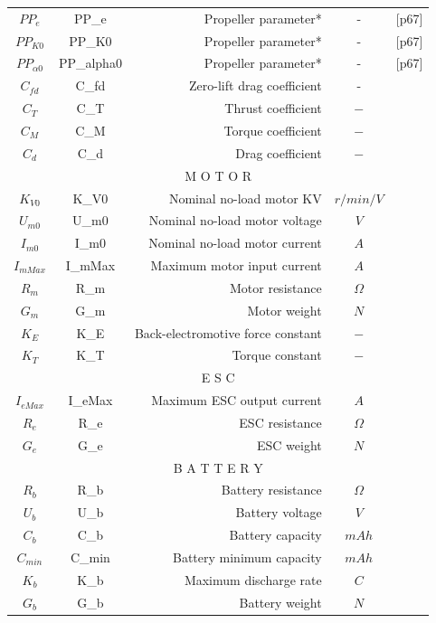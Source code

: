 \documentclass{article} %
\numberwithin{equation}{section} %
\begin{document}
{\begin{tabular}{c|c|r|c|l}
$PP_e$           	   	& PP\_e			& Propeller parameter*        		& -          		& \cite{qq}[p67]\\
$PP_{K0}$        	   	& PP\_K0		& Propeller parameter*        		& -          		& \cite{qq}[p67]\\
$PP_{\alpha0}$   	   	& PP\_alpha0	& Propeller parameter*        		& -          		& \cite{qq}[p67]\\
$C_{fd}$         	    & C\_fd			& Zero-lift drag coefficient    	& -          		& \\
$C_T$					& C\_T 			& Thrust coefficient				& $-$				& \\
$C_M$					& C\_M 			& Torque coefficient				& $-$				& \\
$C_d$					& C\_d 			& Drag coefficient					& $-$				& \\
\hline
\multicolumn{5}{c}{M O T O R}\\ 
\hline
$K_{V0}$				& K\_V0 		& Nominal no-load motor KV			& $r/min/V$			& \\
$U_{m0}$				& U\_m0 		& Nominal no-load motor voltage		& $V$				& \\
$I_{m0}$				& I\_m0 		& Nominal no-load motor current		& $A$				& \\
$I_{mMax}$				& I\_mMax		& Maximum motor input current		& $A$				& \\
$R_m$					& R\_m 			& Motor resistance					& $\Omega$			& \\
$G_{m}$          		& G\_m 			& Motor weight                      & $N$          		& \\
$K_E$					& K\_E 			& Back-electromotive force constant & $-$				& \\
$K_T$					& K\_T 			& Torque constant					& $-$				& \\
\hline
\multicolumn{5}{c}{E S C}\\ 
\hline
$I_{eMax}$				& I\_eMax		& Maximum ESC output current		& $A$				& \\
$R_{e}$					& R\_e 			& ESC resistance					& $\Omega$			& \\
$G_e$            		& G\_e 			& ESC weight                        & $N$          		& \\
\hline
\multicolumn{5}{c}{B A T T E R Y}\\ 
\hline
$R_{b}$					& R\_b 			& Battery resistance				& $\Omega$			& \\
$U_{b}$					& U\_b 			& Battery voltage					& $V$				& \\
$C_{b}$					& C\_b 			& Battery capacity					& $mAh$				& \\
$C_{min}$				& C\_min 		& Battery minimum capacity			& $mAh$				& \\
$K_{b}$					& K\_b 			& Maximum discharge rate			& $C$				& \\
$G_b$            		& G\_b 			& Battery weight                    & $N$          		& \\
\bottomrule
\end{tabular}
\label{tab:basic_constant}
}
\end{document}
